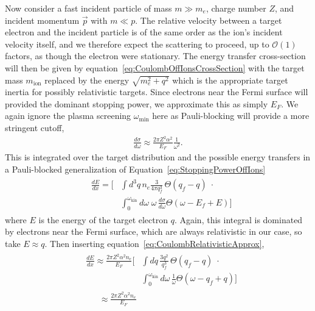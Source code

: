 \documentclass[twocolumn, preprintnumbers,amsmath,amssymb,prd, superscriptaddress]{revtex4}
\newcommand{\OO}{\mathcal{O}}
\begin{document}
\begin{appendices}
Now consider a fast incident particle of mass $m \gg m_e$, charge number $Z$, and incident momentum $\vec{p}$ with $m \ll p$.
The relative velocity between a target electron and the incident particle is of the same order as the ion's incident velocity itself, and we therefore expect the scattering to proceed, up to $\OO(1)$ factors, as though the electron were stationary.
The energy transfer cross-section will then be given by equation~\eqref{eq:CoulombOffIonsCrossSection} with the target mass $m_\text{ion}$ replaced by the energy $\sqrt{m_e^2 + q^2}$ which is the appropriate target inertia for possibly relativistic targets.
Since electrons near the Fermi surface will provided the dominant stopping power, we approximate this as simply $E_F$.
We again ignore the plasma screening $\omega_\text{min}$ here as Pauli-blocking will provide a more stringent cutoff,
\begin{align}
  \frac{d \sigma}{d \omega} \approx
  \frac{2 \pi Z^2 \alpha^2}{E_F} \frac{1}{\omega^2}.
  \label{eq:CoulombRelativisticApprox}
\end{align}
This is integrated over the target distribution and the possible energy transfers in a Pauli-blocked generalization of Equation~\eqref{eq:StoppingPowerOffIons}
\begin{align}
\label{eq:stoppingpower_db}
  &\begin{aligned}  \frac{dE}{dx} = \Bigg[
      &\int d^3q \, n_e \frac{3}{4\pi q_f^3} \, \Theta(q_f - q) \; \cdot \\
      &\int_0^{\omega_\text{kin}} d\omega \;
      \omega \, \frac{d\sigma}{d\omega}
      \Theta\left(\omega - E_f + E\right) \Bigg] \end{aligned}
\end{align}
where $E$ is the energy of the target electron $q$.
Again, this integral is dominated by electrons near the Fermi surface, which are always relativistic in our case, so take $E \approx q$.
Then inserting equation~\eqref{eq:CoulombRelativisticApprox},
\begin{align}
 &\begin{aligned} \frac{dE}{dx} \approx
    \frac{2 \pi Z^2 \alpha^2 n_e}{E_F}  \Bigg[
      &\int dq \, \frac{3 q^2}{q_f^3} \, \Theta(q_f - q) \; \cdot \nonumber \\
      &\int_0^{\omega_\text{kin}} d\omega \, \frac{1}{\omega}
      \Theta\left(\omega - q_f + q\right) \Bigg] \end{aligned} \\
  & \;\;\;\;\;\;\; \approx \frac{2 \pi Z^2 \alpha^2 n_e}{E_F} \,

\end{align}
\end{appendices}
\end{document}
